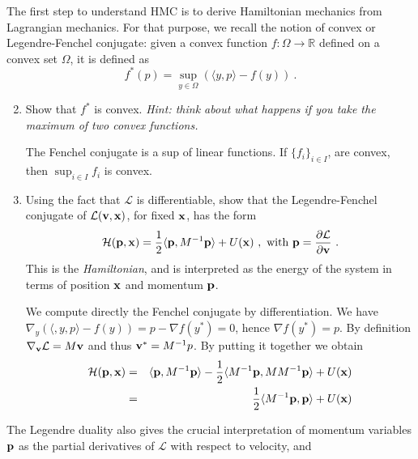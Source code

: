 \documentclass{article}
\newcommand{\R}{\mathbb{R}}
\newcommand{\xx}{{\bf x}}
\newcommand{\pp}{{\bf p}}
\newcommand{\vv}{{\bf v}}
\begin{document}
The first step to understand HMC is to derive Hamiltonian mechanics from Lagrangian mechanics. For that purpose, we recall the notion of convex or Legendre-Fenchel conjugate: given a convex function $f: \Omega \to \R$ defined on a convex set $\Omega$, it is defined as 
\begin{equation}
f^*(p) = \sup_{y \in \Omega} \left( \langle y, p \rangle - f(y) \right)~.
\end{equation}
\begin{enumerate}
\setcounter{enumi}{1}
\item Show that $f^*$ is convex. {\it Hint: think about what happens if you take the maximum of two convex functions.}

{\color{blue}
The Fenchel conjugate is a sup of linear functions. If $\{f_i\}_{i \in I}$,  are convex, then $\sup_{i \in I} f_i$ is convex.
}

\item Using the fact that $\mathcal{L}$ is differentiable, show that the Legendre-Fenchel conjugate of $\mathcal{L}(\vv, \xx)$, for fixed $\xx$, has the form 
\begin{equation}
\label{hami}
\mathcal{H}(\pp, \xx) = \frac{1}{2} \langle \pp, M^{-1} \pp \rangle + U(\xx)~,\text{ with } \pp = \frac{\partial \mathcal{L}}{\partial \vv}~.
\end{equation}
This is the \emph{Hamiltonian}, and is interpreted as the energy of the system in terms of position $\xx$ and momentum $\pp$.

{\color{blue}
We compute directly the Fenchel conjugate by differentiation. 
We have $\nabla_y ( \langle, y, p \rangle - f(y) ) = p - \nabla f(y^*) = 0$, hence $\nabla f(y^*) = p$. 
By definition $\nabla_{\vv} \mathcal{L} = M \vv$ and thus $\vv^* = M^{-1} p$. 
By putting it together we obtain
\begin{eqnarray*}
\mathcal{H}(\pp, \xx) &=& \langle \pp, M^{-1} \pp \rangle - \frac{1}{2} \langle M^{-1} \pp, M M^{-1} \pp \rangle + U(\xx) \\
&=& \frac{1}{2} \langle M^{-1} \pp,  \pp \rangle + U(\xx)
\end{eqnarray*}
}

\end{enumerate}
The Legendre duality also gives the crucial interpretation 
of momentum variables $\pp$ as the partial derivatives of $\mathcal{L}$ with respect to velocity, and
\end{document}
